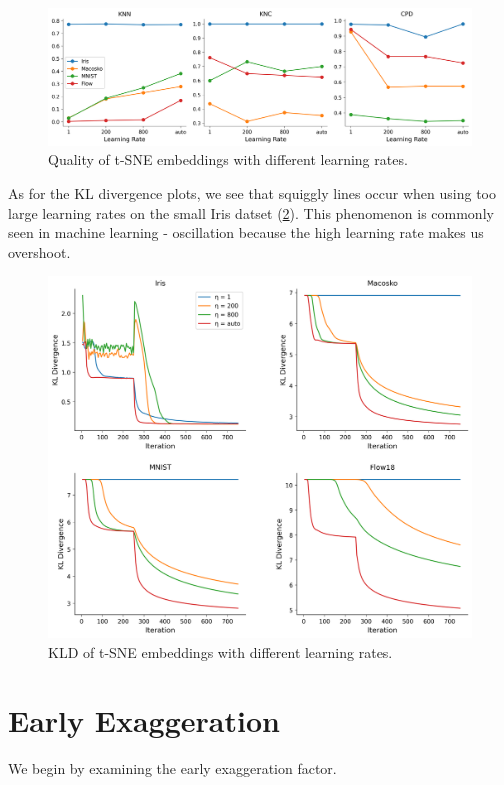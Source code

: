 \begin{figure}[h]
    \centering 
        \includegraphics[width=\linewidth]{../code/figures/eta_3_quality_measures.png}
        \caption{Quality of t-SNE embeddings with different learning rates.}
    \label{fig:eta_quality}
\end{figure}
As for the KL divergence plots, we see that squiggly lines occur when using too large learning rates on the small Iris datset (\ref{fig:eta_kld}). This phenomenon is commonly seen in machine learning - oscillation because the high learning rate makes us overshoot. 
\begin{figure}[h]
    \centering 
        \includegraphics[width=\linewidth]{../code/figures/eta_kl_divergences_grid.png}
        \caption{KLD of t-SNE embeddings with different learning rates.}
    \label{fig:eta_kld}
\end{figure}
\newpage 
\section{Early Exaggeration}
We begin by examining the early exaggeration factor. 

